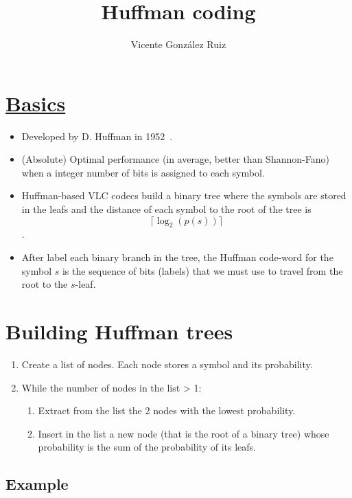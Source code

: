 \title{Huffman coding}
\author{Vicente González Ruiz}
\maketitle
\tableofcontents

\section{\href{https://en.wikipedia.org/wiki/Huffman_coding}{Basics}}
\begin{itemize}
  \tightlist
\item Developed by D. Huffman in 1952~\cite{huffman1952method}.
\item
  (Absolute) Optimal performance (in average, better than Shannon-Fano)
  when a integer number of bits is assigned to each symbol.
\item
  Huffman-based VLC codecs build a binary tree where the symbols are
  stored in the leafs and the distance of each symbol to the root of the
  tree is \[\lceil\log_2(p(s))\rceil\].
\item
  After label each binary branch in the tree, the Huffman code-word for
  the symbol \(s\) is the sequence of bits (labels) that we must use to
  travel from the root to the \(s\)-leaf.
\end{itemize}

\section{Building Huffman trees}
\begin{enumerate}
\tightlist
\item
  Create a list of nodes. Each node stores a symbol and its probability.
\item
  While the number of nodes in the list \textgreater{} 1:
  \begin{enumerate}
  \tightlist
  \item
    Extract from the list the 2 nodes with the lowest probability.
  \item
    Insert in the list a new node (that is the root of a binary tree)
    whose probability is the sum of the probability of its leafs.
  \end{enumerate}
\end{enumerate}

\subsection{Example}


